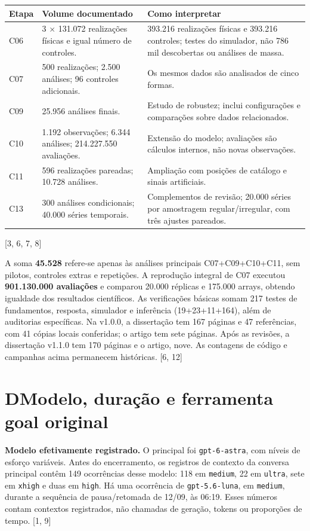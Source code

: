 \documentclass[11pt,a4paper]{article}
\newcommand{\fonte}[1]{{\small\color{navy}[#1]}}
\newcommand{\titulo}[2]{\section*{\color{navy}#1\quad #2}}
\begin{document}
\begin{tabularx}{\textwidth}{@{}p{1.3cm}Y Y@{}}
\toprule
\textbf{Etapa} & \textbf{Volume documentado} & \textbf{Como interpretar}\\
\midrule
C06 & 3 $\times$ 131.072 realizações físicas e igual número de controles. & 393.216 realizações físicas e 393.216 controles; testes do simulador, não 786 mil descobertas ou análises de massa.\\
C07 & 500 realizações; 2.500 análises; 96 controles adicionais. & Os mesmos dados são analisados de cinco formas.\\
C09 & 25.956 análises finais. & Estudo de robustez; inclui configurações e comparações sobre dados relacionados.\\
C10 & 1.192 observações; 6.344 análises; 214.227.550 avaliações. & Extensão do modelo; avaliações são cálculos internos, não novas observações.\\
C11 & 596 realizações pareadas; 10.728 análises. & Ampliação com posições de catálogo e sinais artificiais.\\
C13 & 300 análises condicionais; 40.000 séries temporais. & Complementos de revisão; 20.000 séries por amostragem regular/irregular, com três ajustes pareados.\\
\bottomrule
\end{tabularx}
\fonte{3, 6, 7, 8}

A soma \textbf{45.528} refere-se apenas às análises principais C07+C09+C10+C11, sem pilotos, controles extras e repetições. A reprodução integral de C07 executou \textbf{901.130.000 avaliações} e comparou 20.000 réplicas e 175.000 arrays, obtendo igualdade dos resultados científicos. As verificações básicas somam 217 testes de fundamentos, resposta, simulador e inferência (19+23+11+164), além de auditorias específicas. Na v1.0.0, a dissertação tem 167 páginas e 47 referências, com 41 cópias locais conferidas; o artigo tem sete páginas. Após as revisões, a dissertação v1.1.0 tem 170 páginas e o artigo, nove. As contagens de código e campanhas acima permanecem históricas. \fonte{6, 12}
\newpage

\titulo{D}{Modelo, duração e ferramenta goal original}
\textbf{Modelo efetivamente registrado.} O principal foi \nolinkurl{gpt-6-astra}, com níveis de esforço variáveis. Antes do encerramento, os registros de contexto da conversa principal contêm 149 ocorrências desse modelo: 118 em \nolinkurl{medium}, 22 em \nolinkurl{ultra}, sete em \nolinkurl{xhigh} e duas em \nolinkurl{high}. Há uma ocorrência de \nolinkurl{gpt-5.6-luna}, em \nolinkurl{medium}, durante a sequência de pausa/retomada de 12/09, às 06:19. Esses números contam contextos registrados, não chamadas de geração, tokens ou proporções de tempo. \fonte{1, 9}
\end{document}

